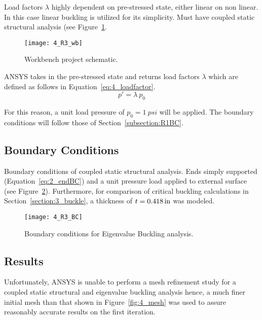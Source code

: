 Load factors $\lambda$ highly dependent on pre-stressed state, either linear on non linear.\\

In this case linear buckling is utilized for its simplicity. Must have coupled static structural analysis (see Figure~\ref{fig:4_R3_wb}.

\begin{figure}[H]
	\centering
	\texttt{[image: 4\_R3\_wb]}
	\caption{Workbench project schematic.}
	\label{fig:4_R3_wb}
\end{figure}

ANSYS takes in the pre-stressed state and returns load factors $\lambda$ which are defined as follows in Equation~\ref{eq:4_loadfactor}.
\begin{equation}
	\label{eq:4_loadfactor}
	p' = \lambda \ p_0
\end{equation}

For this reason, a unit load pressure of $p_0 = 1\ psi$ will be applied. The boundary conditions will follow those of Section~\ref{subsection:R1BC}.

\subsection{Boundary Conditions}

Boundary conditions of coupled static structural analysis. Ends simply supported (Equation~\ref{eq:2_endBC}) and a unit pressure load applied to external surface (see Figure~\ref{fig:4_R3_BC}). Furthermore, for comparison of critical buckling calculations in Section~\ref{section:3_buckle}, a thickness of $t=0.418\,\mathrm{in}$ was modeled. 

\begin{figure}[H]
	\centering
	\texttt{[image: 4\_R3\_BC]}
	\caption{Boundary conditions for Eigenvalue Buckling analysis.}
	\label{fig:4_R3_BC}
\end{figure}

\subsection{Results}

Unfortunately, ANSYS is unable to perform a mesh refinement study for a coupled static structural and eigenvalue buckling analysis hence, a much finer initial mesh than that shown in Figure~\ref{fig:4_mesh} was used to assure reasonably accurate results on the first iteration.\\

